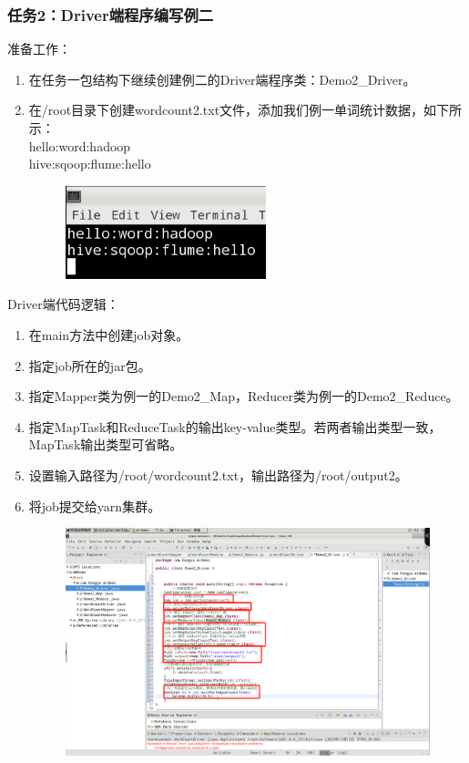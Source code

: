 \documentclass {article}
\begin{document}
			\subsubsection{任务2：Driver端程序编写例二}
				准备工作：
				\begin{enumerate}
					\item 在任务一包结构下继续创建例二的Driver端程序类：Demo2\_Driver。
					\item 在/root目录下创建wordcount2.txt文件，添加我们例一单词统计数据，如下所示：\\
					hello:word:hadoop \\
					hive:sqoop:flume:hello
					
					\begin{figure}[H]
						\centering
						\includegraphics{figures/fig12.png}
					\end{figure}
				\end{enumerate}
			
				Driver端代码逻辑：
				\begin{enumerate}
					\item 在main方法中创建job对象。
					\item 指定job所在的jar包。
					\item 指定Mapper类为例一的Demo2\_Map，Reducer类为例一的Demo2\_Reduce。
					\item 指定MapTask和ReduceTask的输出key-value类型。若两者输出类型一致，MapTask输出类型可省略。
					\item 设置输入路径为/root/wordcount2.txt，输出路径为/root/output2。
					\item 将job提交给yarn集群。
					\begin{figure}[H]
						\centering
						\includegraphics[width=4.5in]{figures/fig13.png}
					\end{figure}
				\end{enumerate}
			
\end{document}
